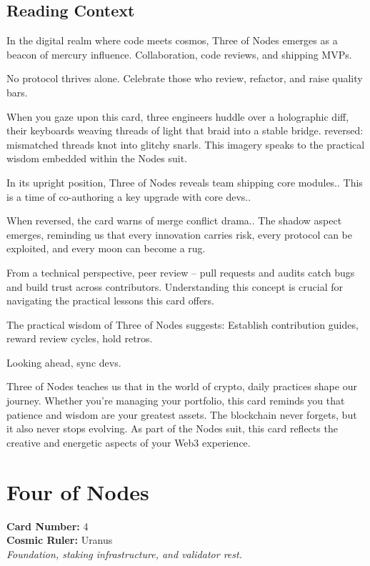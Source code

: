 \documentclass[11pt,oneside]{book}
\begin{document}
\begin{minipage}[t]{0.55\textwidth}
  \subsection*{Reading Context}
  In the digital realm where code meets cosmos, Three of Nodes emerges as a beacon of mercury influence. Collaboration, code reviews, and shipping MVPs.

  No protocol thrives alone. Celebrate those who review, refactor, and raise quality bars.

  When you gaze upon this card, three engineers huddle over a holographic diff, their keyboards weaving threads of light that braid into a stable bridge. reversed: mismatched threads knot into glitchy snarls. This imagery speaks to the practical wisdom embedded within the Nodes suit.

  In its upright position, Three of Nodes reveals team shipping core modules.. This is a time of co-authoring a key upgrade with core devs..

  When reversed, the card warns of merge conflict drama.. The shadow aspect emerges, reminding us that every innovation carries risk, every protocol can be exploited, and every moon can become a rug.

  From a technical perspective, peer review – pull requests and audits catch bugs and build trust across contributors. Understanding this concept is crucial for navigating the practical lessons this card offers.

  The practical wisdom of Three of Nodes suggests: Establish contribution guides, reward review cycles, hold retros.

  Looking ahead, sync devs.

  Three of Nodes teaches us that in the world of crypto, daily practices shape our journey. Whether you're managing your portfolio, this card reminds you that patience and wisdom are your greatest assets. The blockchain never forgets, but it also never stops evolving. As part of the Nodes suit, this card reflects the creative and energetic aspects of your Web3 experience.

\end{minipage}

\newpage
\section*{Four of Nodes}

\begin{minipage}[t]{0.55\textwidth}
  \vspace{0pt}
  \textbf{Card Number:} 4\\  \textbf{Cosmic Ruler:} Uranus\\  \textit{Foundation, staking infrastructure, and validator rest.}
\end{minipage}
\end{document}
